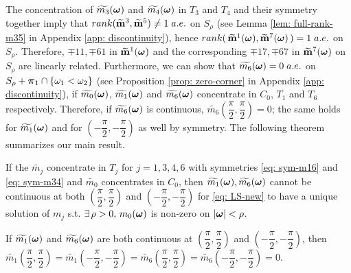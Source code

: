 The concentration of $\widetilde{m_{3}}(\boldsymbol{\omega})$ and $\widetilde{m_{4}}(\boldsymbol{\omega})$ in $T_3$ and $T_4$ and their symmetry together imply that  $rank(\widetilde{\mathbf{m}}^{3},\widetilde{\mathbf{m}}^{5}) \neq 1\; a.e.$ on $S_\rho$ (see Lemma \ref{lem: full-rank-m35} in Appendix \ref{app: discontinuity}), hence $rank(\,\widetilde{\mathbf{m}}^{1}(\boldsymbol{\omega}),\widetilde{\mathbf{m}}^{7}(\boldsymbol{\omega})\,) = 1\; a.e.$ on $S_\rho$.
Therefore, $\mp{1}{1}, \mp{6}{1}$ in $\widetilde{\mathbf{m}}^{1}(\boldsymbol{\omega})$ and the corresponding $\mp{1}{7}, \mp{6}{7}$ in $\widetilde{\mathbf{m}}^{7}(\boldsymbol{\omega})$ on $S_\rho$ are linearly related. Furthermore, we can show that $\widetilde{m_{6}}(\boldsymbol{\omega})=0\; a.e.$ on $S_\rho + \boldsymbol{\pi}_1\cap \{\omega_1 < \omega_2\}$ (see Proposition \ref{prop: zero-corner} in Appendix \ref{app: discontinuity}), if $\widetilde{m_{0}}(\boldsymbol{\omega})$, $\widetilde{m_{1}}(\boldsymbol{\omega})$ and $\widetilde{m_{6}}(\boldsymbol{\omega})$ concentrate in $C_0$, $T_1$ and $T_6$ respectively. Therefore, if $\widetilde{m_{6}}(\boldsymbol{\omega})$ is continuous, $\widetilde{m_6}(\dfrac{\pi}{2},\dfrac{\pi}{2}) = 0$; the same holds for $\widetilde{m_{1}}(\boldsymbol{\omega})$ and for $(-\dfrac{\pi}{2},-\dfrac{\pi}{2})$ as well by symmetry.%
The following theorem summarizes our main result.
\begin{theorem}\label{thm: thm}
If the $\widetilde{m_j}$ concentrate in $T_j$ for $j= 1,3,4,6$ with symmetries \eqref{eq: sym-m16} and \eqref{eq: sym-m34} and $\widetilde{m_0}$ concentrates in $C_0$, then $\widetilde{m_{1}}(\boldsymbol{\omega}),\widetilde{m_{6}}(\boldsymbol{\omega})$ cannot be continuous at both $(\dfrac{\pi}{2},\dfrac{\pi}{2})$ and $(-\dfrac{\pi}{2},-\dfrac{\pi}{2})$ for \eqref{eq: LS-new} to have a unique solution of $m_j$ s.t. $\exists\,\rho>0,\,m_0(\boldsymbol{\omega})$ is non-zero on $|\boldsymbol{\omega}|<\rho$.
\end{theorem}
If $\widetilde{m_{1}}(\boldsymbol{\omega})$ and $\widetilde{m_{6}}(\boldsymbol{\omega})$ are both continuous at $(\dfrac{\pi}{2},\dfrac{\pi}{2})$ and $(-\dfrac{\pi}{2},-\dfrac{\pi}{2})$, then $\widetilde{m_1}(\dfrac{\pi}{2},\dfrac{\pi}{2}) = \widetilde{m_1}(-\dfrac{\pi}{2}, -\dfrac{\pi}{2}) = \widetilde{m_6}(\dfrac{\pi}{2},\dfrac{\pi}{2}) = \widetilde{m_6}(-\dfrac{\pi}{2},-\dfrac{\pi}{2}) = 0$. %
